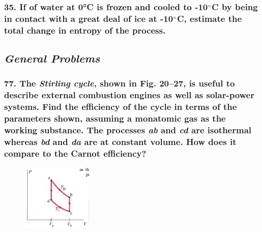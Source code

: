\documentclass{article}
\begin{document}
\subsubsection*{
    35. If of water at 0°C is frozen and cooled to -10$\degree$C 
    by being in contact with a great deal of ice at -10$\degree$C,
    estimate the total change in entropy of the process.
}
\newpage
\begin{center}
    \subsection*{\textbf{\textit{General Problems}}}
\end{center}
\subsubsection*{
    77. The \textit{Stirling cycle}, shown in Fig. 20–27, is useful to describe
    external combustion engines as well as solar-power systems.
    Find the efficiency of the cycle in terms of the parameters
    shown, assuming a monatomic gas as the working substance. The
    processes \textit{ab} and \textit{cd} are isothermal whereas \textit{bd} and \textit{da} are at constant
    volume. How does it compare to the Carnot efficiency?
}
\begin{figure}[h]
    \includegraphics[width=0.3\textwidth]{figures/20-27.png}
\end{figure}

\newpage
\end{document}
